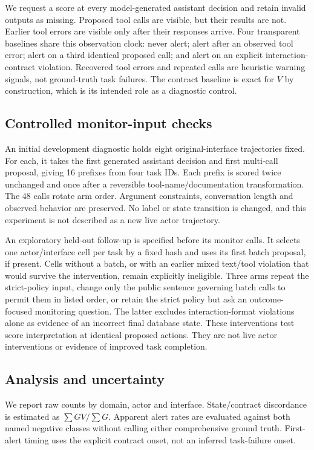 \documentclass[10pt]{article}
\begin{document}
We request a score at every model-generated assistant decision and retain invalid outputs as missing. Proposed tool calls are visible, but their results are not. Earlier tool errors are visible only after their responses arrive. Four transparent baselines share this observation clock: never alert; alert after an observed tool error; alert on a third identical proposed call; and alert on an explicit interaction-contract violation. Recovered tool errors and repeated calls are heuristic warning signals, not ground-truth task failures. The contract baseline is exact for $V$ by construction, which is its intended role as a diagnostic control.

\subsection{Controlled monitor-input checks}
An initial development diagnostic holds eight original-interface trajectories fixed. For each, it takes the first generated assistant decision and first multi-call proposal, giving 16 prefixes from four task IDs. Each prefix is scored twice unchanged and once after a reversible tool-name/documentation transformation. The 48 calls rotate arm order. Argument constraints, conversation length and observed behavior are preserved. No label or state transition is changed, and this experiment is not described as a new live actor trajectory.

An exploratory held-out follow-up is specified before its monitor calls. It selects one actor/interface cell per task by a fixed hash and uses its first batch proposal, if present. Cells without a batch, or with an earlier mixed text/tool violation that would survive the intervention, remain explicitly ineligible. Three arms repeat the strict-policy input, change only the public sentence governing batch calls to permit them in listed order, or retain the strict policy but ask an outcome-focused monitoring question. The latter excludes interaction-format violations alone as evidence of an incorrect final database state. These interventions test score interpretation at identical proposed actions. They are not live actor interventions or evidence of improved task completion.

\subsection{Analysis and uncertainty}
We report raw counts by domain, actor and interface. State/contract discordance is estimated as $\sum GV/\sum G$. Apparent alert rates are evaluated against both named negative classes without calling either comprehensive ground truth. First-alert timing uses the explicit contract onset, not an inferred task-failure onset.
\end{document}
